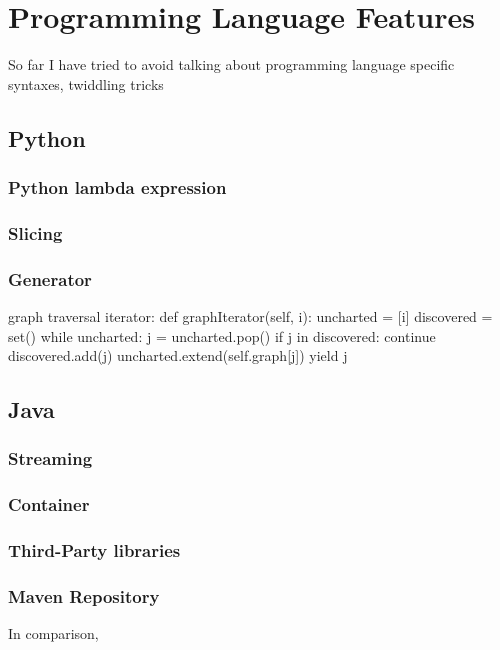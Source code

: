 \chapter{Programming Language Features}\label{ch:knowTheLanguageFeatures}

So far I have tried to avoid talking about programming language specific syntaxes, twiddling
tricks
\section{Python}\label{sec:python}
\subsection{Python lambda expression}\label{subsec:pythonLambdaExpression}
\subsection{Slicing}\label{subsec:slicing}
\subsection{Generator}\label{subsec:generator}




graph traversal iterator:
    def graphIterator(self, i):
        uncharted = [i]
        discovered = set()
        while uncharted:
            j = uncharted.pop()
            if j in discovered:
                continue
            discovered.add(j)
            uncharted.extend(self.graph[j])
            yield j


\section{Java}\label{sec:java}
\subsection{Streaming}\label{subsec:streaming}
\subsection{Container}\label{subsec:container}
\subsection{Third-Party libraries}\label{subsec:third-partyLibraries}
\subsection{Maven Repository}\label{subsec:mavenRepository}

In comparison, \java

